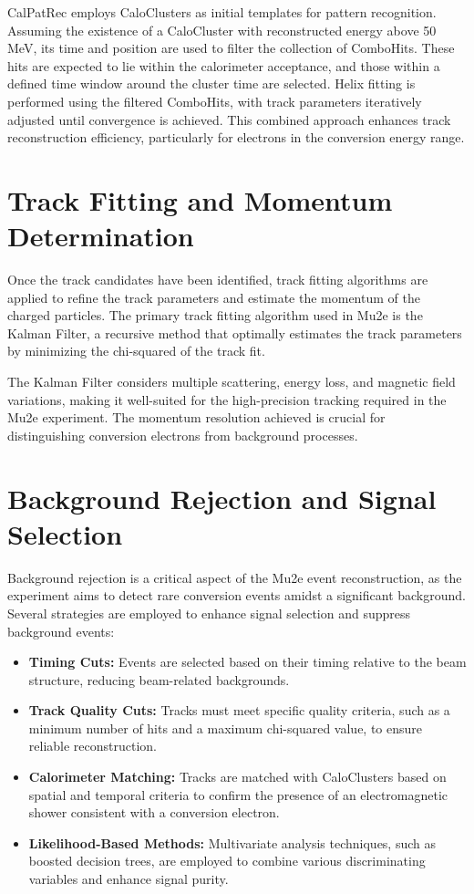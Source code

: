 CalPatRec employs CaloClusters as initial templates for pattern 
recognition. Assuming the existence of a CaloCluster with reconstructed 
energy above 50 MeV, its time and position are used to filter the collection of 
ComboHits. These hits are expected to lie within the calorimeter acceptance, 
and those within a defined time window around the cluster time are selected. 
Helix fitting is performed using the filtered ComboHits, with track parameters 
iteratively adjusted until convergence is achieved. This combined approach 
enhances track reconstruction efficiency, particularly for electrons in the conversion energy range.

\section{Track Fitting and Momentum Determination}

Once the track candidates have been identified, track fitting algorithms 
are applied to refine the track parameters and estimate the momentum of the 
charged particles. The primary track fitting algorithm used in Mu2e is the Kalman 
Filter, a recursive method that optimally estimates the track parameters by minimizing the chi-squared of the track fit.

The Kalman Filter considers multiple scattering, energy loss, and magnetic 
field variations, making it well-suited for the high-precision tracking 
required in the Mu2e experiment. The momentum resolution achieved is crucial 
for distinguishing conversion electrons from background processes.

\section{Background Rejection and Signal Selection}

Background rejection is a critical aspect of the Mu2e event reconstruction, 
as the experiment aims to detect rare conversion events amidst a significant 
background. Several strategies are employed to enhance signal selection and suppress background events:

\begin{itemize}
    \item \textbf{Timing Cuts:} Events are selected based on their timing relative 
    to the beam structure, reducing beam-related backgrounds.
    \item \textbf{Track Quality Cuts:} Tracks must meet specific quality criteria, 
    such as a minimum number of hits and a maximum chi-squared value, to ensure reliable reconstruction.
    \item \textbf{Calorimeter Matching:} Tracks are matched with CaloClusters based 
    on spatial and temporal criteria to confirm the presence of an electromagnetic 
    shower consistent with a conversion electron.
    \item \textbf{Likelihood-Based Methods:} Multivariate analysis techniques, such 
    as boosted decision trees, are employed to combine various discriminating 
    variables and enhance signal purity.
\end{itemize}

